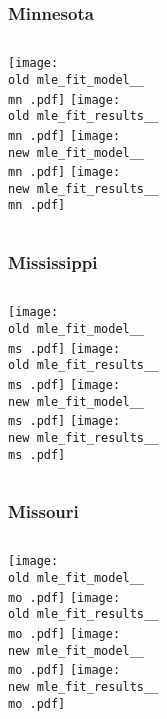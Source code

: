 \documentclass{beamer}
\newcommand{\old}{current_two_stage_output/pyseir/state_summaries/reports/}
\newcommand{\new}{new_shortest_t_delta/pyseir/state_summaries/reports/}
\newcommand{\mn}{Minnesota__27}
\newcommand{\ms}{Mississippi__28}
\newcommand{\mo}{Missouri__29}
\begin{document}
\begin{frame}
\frametitle{Minnesota}
    \begin{columns}[t]

       \texttt{[image: \\old mle\_fit\_model\_\_\\mn .pdf]}
       \texttt{[image: \\old mle\_fit\_results\_\_\\mn .pdf]}   
       \texttt{[image: \\new mle\_fit\_model\_\_\\mn .pdf]}
       \texttt{[image: \\new mle\_fit\_results\_\_\\mn .pdf]}   
\end{columns}
\end{frame}

\begin{frame}
\frametitle{Mississippi}
    \begin{columns}[t]

       \texttt{[image: \\old mle\_fit\_model\_\_\\ms .pdf]}
       \texttt{[image: \\old mle\_fit\_results\_\_\\ms .pdf]}   
       \texttt{[image: \\new mle\_fit\_model\_\_\\ms .pdf]}
       \texttt{[image: \\new mle\_fit\_results\_\_\\ms .pdf]}   
\end{columns}
\end{frame}

\begin{frame}
\frametitle{Missouri}
    \begin{columns}[t]

       \texttt{[image: \\old mle\_fit\_model\_\_\\mo .pdf]}
       \texttt{[image: \\old mle\_fit\_results\_\_\\mo .pdf]}   
       \texttt{[image: \\new mle\_fit\_model\_\_\\mo .pdf]}
       \texttt{[image: \\new mle\_fit\_results\_\_\\mo .pdf]}   
\end{columns}
\end{frame}
\end{document}
